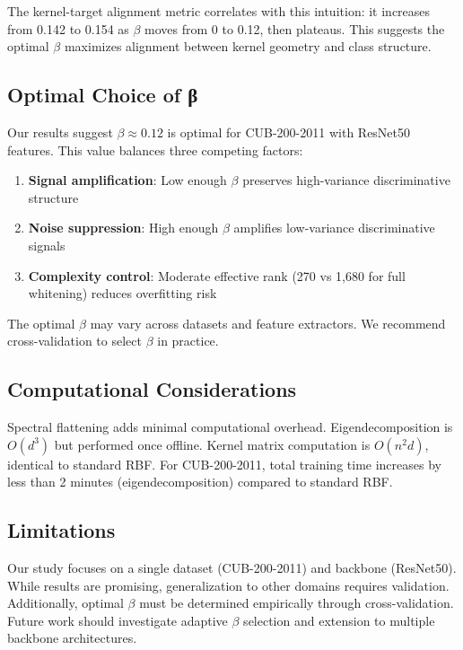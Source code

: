 \documentclass[11pt]{article}
\begin{document}
The kernel-target alignment metric correlates with this intuition: it increases from 0.142 to 0.154 as $\beta$ moves from 0 to 0.12, then plateaus. This suggests the optimal $\beta$ maximizes alignment between kernel geometry and class structure.

\subsection{Optimal Choice of β}

Our results suggest $\beta \approx 0.12$ is optimal for CUB-200-2011 with ResNet50 features. This value balances three competing factors:

\begin{enumerate}
    \item \textbf{Signal amplification}: Low enough $\beta$ preserves high-variance discriminative structure
    \item \textbf{Noise suppression}: High enough $\beta$ amplifies low-variance discriminative signals
    \item \textbf{Complexity control}: Moderate effective rank (270 vs 1,680 for full whitening) reduces overfitting risk
\end{enumerate}

The optimal $\beta$ may vary across datasets and feature extractors. We recommend cross-validation to select $\beta$ in practice.

\subsection{Computational Considerations}

Spectral flattening adds minimal computational overhead. Eigendecomposition is $O(d^3)$ but performed once offline. Kernel matrix computation is $O(n^2d)$, identical to standard RBF. For CUB-200-2011, total training time increases by less than 2 minutes (eigendecomposition) compared to standard RBF.

\subsection{Limitations}

Our study focuses on a single dataset (CUB-200-2011) and backbone (ResNet50). While results are promising, generalization to other domains requires validation. Additionally, optimal $\beta$ must be determined empirically through cross-validation. Future work should investigate adaptive $\beta$ selection and extension to multiple backbone architectures.
\end{document}

